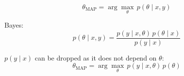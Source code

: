 \begin{answer}

$$\theta_{\text{MAP}}=\arg\max_\theta\, p(\theta\mid x,y)$$

Bayes:
$$p(\theta\mid x,y)=\frac{p(y\mid x,\theta)\,p(\theta\mid x)}{p(y\mid x)}$$

$p(y\mid x)$ can be dropped as it does not depend on $\theta$:
$$\boxed{\;\theta_{\text{MAP}}=\arg\max_\theta\, p(y\mid x,\theta)\,p(\theta)\;}$$ 

\end{answer}
